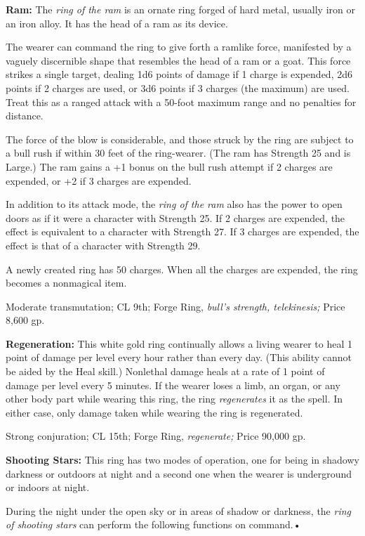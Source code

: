\documentclass{article}
\begin{document}
\textbf{Ram:} The \textit{ring of the ram }is an ornate ring forged of hard metal, 
usually iron or an iron alloy. It has the head of a ram as its device.

The wearer can command the ring to give forth a ramlike force, manifested by a 
vaguely discernible shape that resembles the head of a ram or a goat. This force 
strikes a single target, dealing 1d6 points of damage if 1 charge is expended, 
2d6 points if 2 charges are used, or 3d6 points if 3 charges (the maximum) are 
used. Treat this as a ranged attack with a 50-foot maximum range and no penalties 
for distance. 

The force of the blow is considerable, and those struck by the ring are subject 
to a bull rush if within 30 feet of the ring-wearer. (The ram has Strength 25 and 
is Large.) The ram gains a +1 bonus on the bull rush attempt if 2 charges are expended, 
or +2 if 3 charges are expended.

In addition to its attack mode, the \textit{ring of the ram }also has the power 
to open doors as if it were a character with Strength 25. If 2 charges are expended, 
the effect is equivalent to a character with Strength 27. If 3 charges are expended, 
the effect is that of a character with Strength 29.

A newly created ring has 50 charges. When all the charges are expended, the ring 
becomes a nonmagical item.

Moderate transmutation; CL 9th; Forge Ring, \textit{bull's strength, telekinesis; 
}Price 8,600 gp.

\textbf{Regeneration:} This white gold ring continually allows a living wearer 
to heal 1 point of damage per level every hour rather than every day. (This ability 
cannot be aided by the Heal skill.) Nonlethal damage heals at a rate of 1 point 
of damage per level every 5 minutes. If the wearer loses a limb, an organ, or any 
other body part while wearing this ring, the ring \textit{regenerates }it as the 
spell. In either case, only damage taken while wearing the ring is regenerated.

Strong conjuration; CL 15th; Forge Ring, \textit{regenerate; }Price 90,000 gp.

\textbf{Shooting Stars:} This ring has two modes of operation, one for being in 
shadowy darkness or outdoors at night and a second one when the wearer is underground 
or indoors at night.

During the night under the open sky or in areas of shadow or darkness, the \textit{ring 
of shooting stars }can perform the following functions on command.• 
\end{document}

